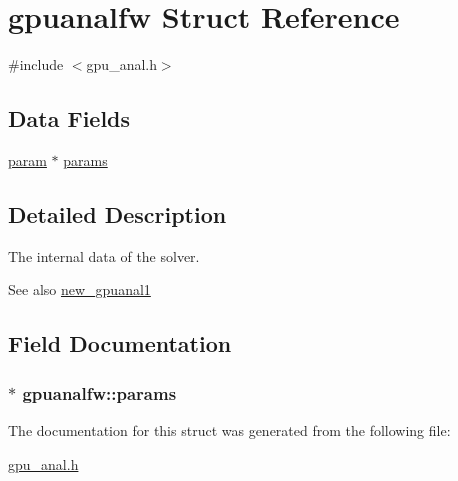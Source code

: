\hypertarget{structgpuanalfw}{
\section{gpuanalfw Struct Reference}
\label{structgpuanalfw}
}


{\ttfamily \#include $<$gpu\_\-anal.h$>$}

\subsection*{Data Fields}
\begin{DoxyCompactItemize}
\item 
\hyperlink{structparam}{param} $\ast$ \hyperlink{structgpuanalfw_a6c7d90f6a2fac6a1617d6592c921c9d8}{params}
\end{DoxyCompactItemize}


\subsection{Detailed Description}
The internal data of the solver. \begin{DoxySeeAlso}{See also}
\hyperlink{gpuanal1_8h_a635a155a39748764eeaeba18dd27efa1}{new\_\-gpuanal1} 
\end{DoxySeeAlso}


\subsection{Field Documentation}
\hypertarget{structgpuanalfw_a6c7d90f6a2fac6a1617d6592c921c9d8}{
\subsubsection[{params}]{$\ast$ {\bf gpuanalfw::params}}}
\label{structgpuanalfw_a6c7d90f6a2fac6a1617d6592c921c9d8}


The documentation for this struct was generated from the following file:\begin{DoxyCompactItemize}
\item 
\hyperlink{gpu__anal_8h}{gpu\_\-anal.h}\end{DoxyCompactItemize}
